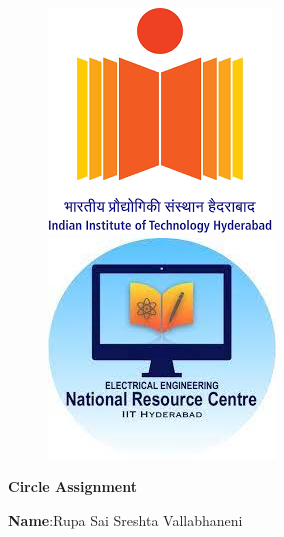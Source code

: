 \documentclass[10pt,a4paper]{report}
\begin{document}
\begin{figure}[!tbp]
  \centering
  \begin{minipage}[b]{0.4\textwidth}
   \includegraphics[scale=0.5]{iithlogo.png} 
  \end{minipage}
  \hfill
  \vspace{5mm}\begin{minipage}[b]{0.4\textwidth}
\raggedleft \includegraphics[scale=0.5]{nrc.jpeg} 
  \end{minipage}\vspace{0.2cm}
\end{figure}
\raggedright 
\begin{center}
\Large \textbf{Circle Assignment}\hspace{2.5cm} %
\end{center}
\begin{center}
\hspace{0.5cm}
\textbf{Name}:\hspace{2mm}Rupa Sai Sreshta Vallabhaneni\hspace{1cm}
\date{25-September-2022}
\end{center}
\end{document}
